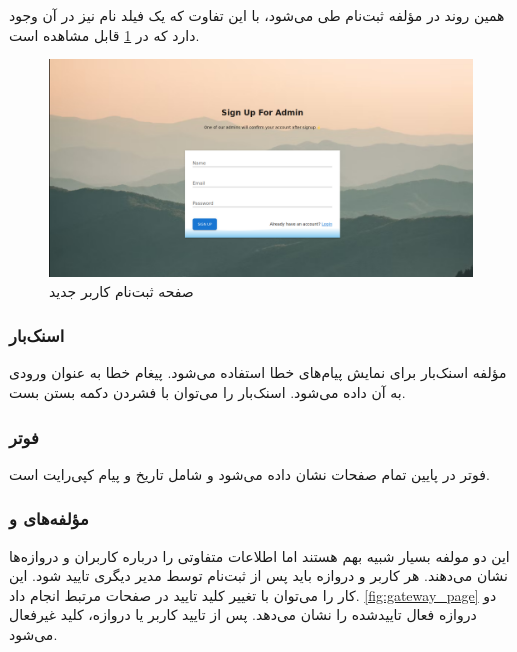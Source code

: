 همین روند در مؤلفه ثبت‌نام طی می‌شود، با این تفاوت که یک فیلد نام نیز در آن وجود دارد که در \cref{fig:signup_page} قابل مشاهده است.

\begin{figure}[!h]
\centering\includegraphics[scale=.38]{signup_page.png}
\caption{صفحه ثبت‌نام کاربر جدید}\label{fig:signup_page}
\end{figure}

\subsubsection{اسنک‌بار}

مؤلفه اسنک‌بار برای نمایش پیام‌های خطا استفاده می‌شود. پیغام خطا به عنوان ورودی به آن داده می‌شود. اسنک‌بار را می‌توان با فشردن دکمه بستن بست.


\subsubsection{فوتر}

فوتر در پایین تمام صفحات نشان داده می‌شود و شامل تاریخ و پیام کپی‌رایت است.

\subsubsection{مؤلفه‌های  و }

این دو مولفه بسیار شبیه بهم هستند اما اطلاعات متفاوتی را درباره کاربران و دروازه‌ها نشان می‌دهند. هر کاربر و دروازه باید پس از ثبت‌نام توسط مدیر دیگری تایید شود. این کار را می‌توان با تغییر کلید تایید در صفحات مرتبط انجام داد. \cref{fig:gateway_page} دو دروازه فعال تاییدشده را نشان می‌دهد. پس از تایید کاربر یا دروازه، کلید غیرفعال می‌شود.

